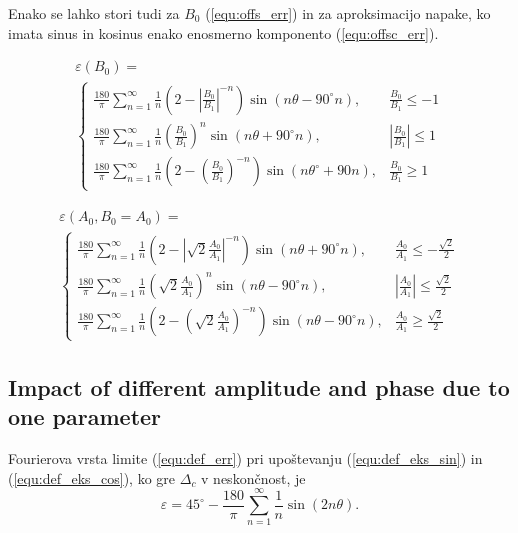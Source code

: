 \documentclass[a4paper]{article}
\begin{document}
Enako se lahko stori tudi za $B_0$ (\ref{equ:offs_err}) in za aproksimacijo napake, ko imata sinus in kosinus enako enosmerno komponento (\ref{equ:offsc_err}).

\begin{multline}
\label{equ:offs_err}
\varepsilon(B_0)=\\
\begin{cases}
\frac{180}{\pi}\sum_{n=1}^{\infty}\frac{1}{n}(2-|\frac{B_0}{B_1}|^{-n}) \sin (n \theta -  90^\circ n), & \frac{B_0}{B_1}\leq -1 \\
\frac{180}{\pi}\sum_{n=1}^{\infty}\frac{1}{n}(\frac{B_0}{B_1})^n \sin (n \theta + 90^\circ n), & |\frac{B_0}{B_1}|\leq 1 \\
\frac{180}{\pi}\sum_{n=1}^{\infty}\frac{1}{n}(2-(\frac{B_0}{B_1})^{-n}) \sin (n \theta^\circ + 90 n), & \frac{B_0}{B_1}\geq 1
\end{cases}
\end{multline}

\begin{multline}
\label{equ:offsc_err}
\varepsilon(A_0,B_0=A_0)=\\
\begin{cases}
\frac{180}{\pi}\sum_{n=1}^{\infty}\frac{1}{n}(2-|\sqrt{2}\frac{A_0}{A_1}|^{-n}) \sin (n \theta + 90^\circ n), & \frac{A_0}{A_1}\leq -\frac{\sqrt{2}}{2} \\
\frac{180}{\pi}\sum_{n=1}^{\infty}\frac{1}{n}(\sqrt{2}\frac{A_0}{A_1})^n \sin (n \theta - 90^\circ n), & |\frac{A_0}{A_1}|\leq \frac{\sqrt{2}}{2} \\
\frac{180}{\pi}\sum_{n=1}^{\infty}\frac{1}{n}(2-(\sqrt{2}\frac{A_0}{A_1})^{-n}) \sin (n \theta - 90^\circ n), & \frac{A_0}{A_1}\geq \frac{\sqrt{2}}{2}
\end{cases}
\end{multline}

\subsection{Impact of different amplitude and phase due to one parameter}

Fourierova vrsta limite (\ref{equ:def_err}) pri upoštevanju (\ref{equ:def_eks_sin}) in (\ref{equ:def_eks_cos}), ko gre $\Delta_c$ v neskončnost, je
\begin{equation}
\label{equ:lim_dc_vrsta}
\varepsilon = 45^\circ -\frac{180}{\pi}\sum_{n=1}^{\infty}\frac{1}{n} \sin( 2 n \theta).
\end{equation}
\end{document}
